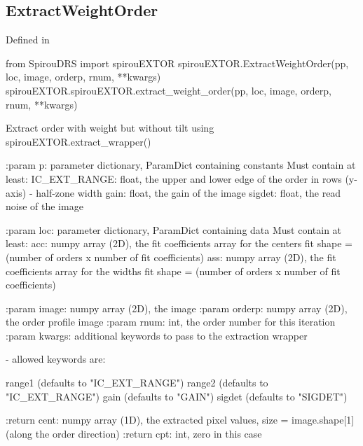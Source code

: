 
\noindent\begin{minipage}{\textwidth}
\subsection{ExtractWeightOrder}

Defined in \spirouEXTOR{}

\begin{pythonbox}
from SpirouDRS import spirouEXTOR
spirouEXTOR.ExtractWeightOrder(pp, loc, image, orderp, rnum, **kwargs)
spirouEXTOR.spirouEXTOR.extract_weight_order(pp, loc, image, orderp, rnum, **kwargs)
\end{pythonbox}

\begin{pythondocstring}
Extract order with weight but without tilt using
spirouEXTOR.extract_wrapper()

:param p: parameter dictionary, ParamDict containing constants
    Must contain at least:
            IC_EXT_RANGE: float, the upper and lower edge of the order
                          in rows (y-axis) - half-zone width
            gain: float, the gain of the image
            sigdet: float, the read noise of the image

:param loc: parameter dictionary, ParamDict containing data
        Must contain at least:
            acc: numpy array (2D), the fit coefficients array for
                  the centers fit
                  shape = (number of orders x number of fit coefficients)
            ass: numpy array (2D), the fit coefficients array for
                  the widths fit
                  shape = (number of orders x number of fit coefficients)

:param image: numpy array (2D), the image
:param orderp: numpy array (2D), the order profile image
:param rnum: int, the order number for this iteration
:param kwargs: additional keywords to pass to the extraction wrapper

        - allowed keywords are:

        range1  (defaults to "IC_EXT_RANGE")
        range2  (defaults to "IC_EXT_RANGE")
        gain    (defaults to "GAIN")
        sigdet  (defaults to "SIGDET")

:return cent: numpy array (1D), the extracted pixel values,
             size = image.shape[1] (along the order direction)
:return cpt: int, zero in this case
\end{pythondocstring}
\end{minipage}


